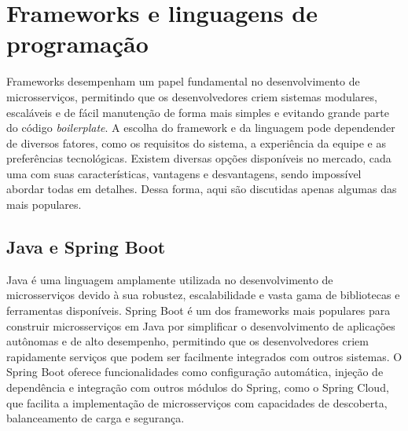 

\section{Frameworks e linguagens de programação}

Frameworks desempenham um papel fundamental no desenvolvimento de microsserviços, permitindo que os desenvolvedores criem sistemas modulares, escaláveis e de fácil manutenção de forma mais simples e evitando grande parte do código \emph{boilerplate}. A escolha do framework e da linguagem pode dependender de diversos fatores, como os requisitos do sistema, a experiência da equipe e as preferências tecnológicas. Existem diversas opções disponíveis no mercado, cada uma com suas características, vantagens e desvantagens, sendo impossível abordar todas em detalhes. Dessa forma, aqui são discutidas apenas algumas das mais populares.

\subsection{Java e Spring Boot}
Java é uma linguagem amplamente utilizada no desenvolvimento de microsserviços devido à sua robustez, escalabilidade e vasta gama de bibliotecas e ferramentas disponíveis. Spring Boot é um dos frameworks mais populares para construir microsserviços em Java por simplificar o desenvolvimento de aplicações autônomas e de alto desempenho, permitindo que os desenvolvedores criem rapidamente serviços que podem ser facilmente integrados com outros sistemas. O Spring Boot oferece funcionalidades como configuração automática, injeção de dependência e integração com outros módulos do Spring, como o Spring Cloud, que facilita a implementação de microsserviços com capacidades de descoberta, balanceamento de carga e segurança. 
\cite{springboot}

